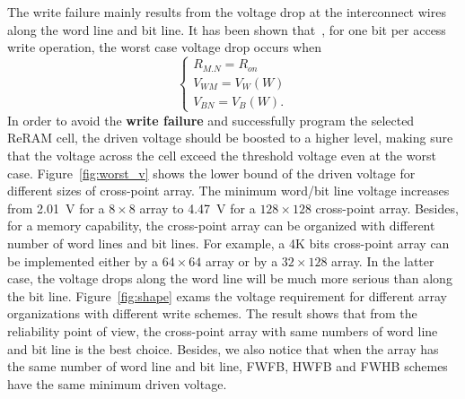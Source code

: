 
The write failure mainly results from the voltage drop at the interconnect wires along the word line and bit line. It has been shown that~\cite{crossbar_TED_2010}, for one bit per access write operation, the worst case voltage drop occurs when
\begin{equation}
\left\{
\begin{array}{l}
R_{M.N}=R_{on}\\
V_{WM}=V_W(W)\\
V_{BN}=V_B(W).
\end{array} \right.
\end{equation}
In order to avoid the \textbf{write failure} and successfully program the
selected ReRAM cell, the driven voltage should be boosted to a higher
level, making sure that the voltage across the cell exceed the threshold
voltage even at the worst case. Figure~\ref{fig:worst_v} shows the lower bound of the driven voltage for different sizes of cross-point array. The minimum word/bit line voltage increases from 2.01~V for a $8 \times 8$ array to 4.47~V for a $128 \times 128$ cross-point array. Besides, for a  memory capability, the cross-point array can be organized with different number of word lines and bit lines. For example, a 4K bits cross-point array can be implemented either by a $64 \times 64$ array or by a $32 \times 128$ array. In the latter case, the voltage drops along the word line will be much more serious than along the bit line. Figure~\ref{fig:shape}
exams the voltage requirement for different array organizations with different write schemes. The result shows that from the reliability point of view, the cross-point array with same numbers of word line and bit line is the best choice. Besides, we also notice that when the array has the same number of word line and bit line, FWFB, HWFB and FWHB schemes have the same minimum driven voltage.


